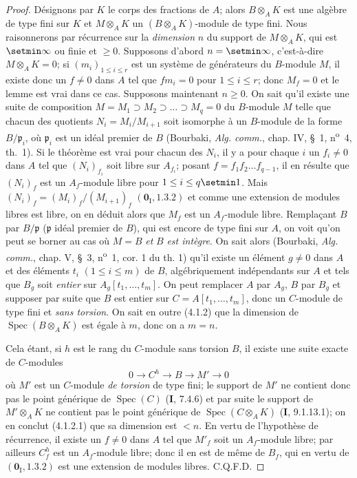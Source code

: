 \begin{proof}
Désignons par $K$ le corps des fractions de $A$; alors $B\otimes_AK$ est une
algèbre de type fini sur $K$ et $M\otimes_AK$ un $(B\otimes_AK)$-module de
type fini. Nous raisonnerons par récurrence
sur la \emph{dimension} $n$ du support de
$M\otimes_AK$, qui est $\setmin\infty$ ou finie et $\geq0$. Supposons d'abord
$n=\setmin\infty$, c'est-à-dire $M\otimes_AK=0$; si $(m_i)_{1\leq i\leq r}$ est
un système de générateurs du $B$-module $M$, il existe donc un $f\ne0$ dans
$A$ tel que $fm_i=0$ pour $1\leq i\leq r$; donc $M_f=0$ et le lemme est vrai
dans ce cas. Supposons maintenant $n\geq0$. On sait qu'il existe une suite de
composition $M=M_1\supset M_2\supset\ldots\supset M_q=0$ du $B$-module $M$
telle que chacun des quotients $N_i=M_i/M_{i+1}$ soit isomorphe à un
$B$-module de la forme $B/\mathfrak p_i$, où $\mathfrak p_i$ est un idéal
premier de $B$ (Bourbaki, \emph{Alg. comm.}, chap. IV, \S~1, n\textsuperscript{o}~4, th.~1).
Si le théorème est vrai pour chacun des $N_i$, il y a pour chaque $i$ un
$f_i\ne0$ dans $A$ tel que $(N_i)_{f_i}$ soit libre sur $A_{f_i}$; posant
$f=f_1f_2\ldots f_{q-1}$, il en résulte que $(N_i)_f$ est un $A_f$-module
libre pour $1\leq i\leq q\setmin 1$. Mais $(N_i)_f=(M_i)_f/(M_{i+1})_f$
$(\mathbf{0}_{\mathrm I},1.3.2)$ et comme une extension de modules libres est libre, on
en déduit alors que $M_f$ est un $A_f$-module libre. Remplaçant $B$ par
$B/\mathfrak p$ ($\mathfrak p$ idéal premier de $B$), qui est encore de type
fini sur $A$, on voit qu'on peut se borner au cas où $M=B$ \emph{et} $B$ \emph{est intègre}.
On sait alors (Bourbaki, \emph{Alg. comm.}, chap. V, \S~3, n\textsuperscript{o}~1, cor. 1 du
th. 1) qu'il existe un élément $g\ne0$ dans $A$ et des éléments $t_i$
$(1\leq i\leq m)$ de $B$, algébriquement indépendants sur $A$ et tels que
$B_g$ soit \emph{entier} sur $A_g[t_1,\ldots,t_m]$. On peut remplacer $A$ par $A_g$,
$B$ par $B_g$ et supposer par suite que $B$ est entier sur
$C=A[t_1,\ldots,t_m]$, donc un $C$-module de type fini et \emph{sans torsion}. On sait
en outre (4.1.2) que la dimension de $\operatorname{Spec}(B\otimes_AK)$ est
égale à $m$, donc on a $m=n$.

Cela étant, si $h$ est le rang du $C$-module sans torsion $B$, il existe une
suite exacte de $C$-modules
\[
0\longrightarrow C^h\longrightarrow B\longrightarrow M'\longrightarrow0
\]
où $M'$ est un $C$-module \emph{de torsion} de type fini; le support de $M'$ ne
contient donc pas le point générique de $\operatorname{Spec}(C)$ (\textbf{I}, 7.4.6)
et par suite le support de $M'\otimes_AK$ ne contient pas le point générique
de $\operatorname{Spec}(C\otimes_AK)$ (\textbf{I}, 9.1.13.1); on en conclut (4.1.2.1)
que sa dimension est $<n$. En vertu de l'hypothèse de récurrence, il existe un
$f\ne0$ dans $A$ tel que $M'_f$ soit un $A_f$-module libre; par ailleurs
$C_f^h$ est un $A_f$-module libre; donc il en est de même de $B_f$, qui en
vertu de $(\mathbf{0}_{\mathrm I},1.3.2)$ est une extension de modules libres. C.Q.F.D.
\end{proof}

